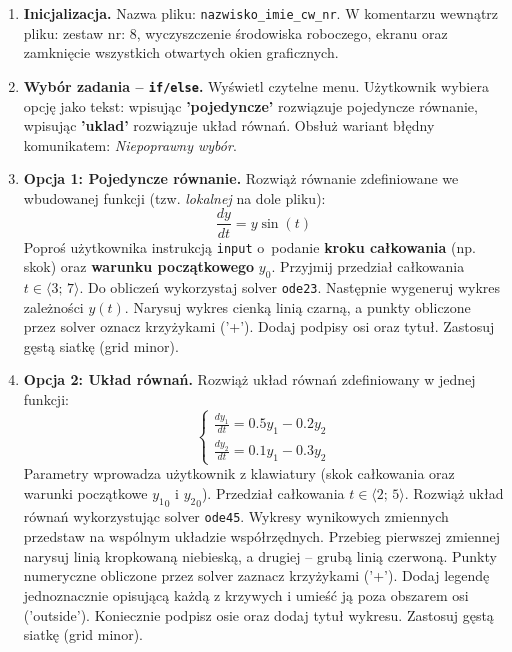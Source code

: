 \documentclass[a4paper,11pt]{article}
\begin{document}
\begin{enumerate}[leftmargin=*, label=\textbf{\arabic*.}, itemsep=2pt]

  \item \textbf{Inicjalizacja.}
    Nazwa pliku: \texttt{nazwisko\_imie\_cw\_nr}. W komentarzu wewnątrz pliku: zestaw nr: 8, wyczyszczenie środowiska roboczego, ekranu oraz zamknięcie wszystkich otwartych okien graficznych.

  \item \textbf{Wybór zadania -- \texttt{if/else}.}
    Wyświetl czytelne menu. Użytkownik wybiera opcję jako tekst: wpisując \textbf{'pojedyncze'} rozwiązuje pojedyncze równanie, wpisując \textbf{'uklad'} rozwiązuje układ równań. Obsłuż wariant błędny komunikatem: \textit{Niepoprawny wybór}.

  \item \textbf{Opcja 1: Pojedyncze równanie.}
    Rozwiąż równanie zdefiniowane we wbudowanej funkcji (tzw. \textit{lokalnej} na dole pliku):
    \[ \frac{dy}{dt} = y\sin(t) \]
    Poproś użytkownika instrukcją \texttt{input} o~podanie \textbf{kroku całkowania} (np. skok) oraz \textbf{warunku początkowego} $y_0$. Przyjmij przedział całkowania $t \in \langle 3;\,7 \rangle$.
    Do obliczeń wykorzystaj solver \texttt{ode23}. Następnie wygeneruj wykres zależności $y(t)$. Narysuj wykres cienką linią czarną, a punkty obliczone przez solver oznacz krzyżykami ('+'). Dodaj podpisy osi oraz tytuł. Zastosuj gęstą siatkę (grid minor).

  \item \textbf{Opcja 2: Układ równań.}
    Rozwiąż układ równań zdefiniowany w jednej funkcji:\\[-0.5em]
    \[
    \begin{cases}
      \frac{dy_1}{dt} = 0.5y_1 - 0.2y_2 \\
      \frac{dy_2}{dt} = 0.1y_1 - 0.3y_2
    \end{cases}
    \]
    Parametry wprowadza użytkownik z klawiatury (skok całkowania oraz warunki początkowe $ {y_1}_{0} $ i $ {y_2}_{0} $). Przedział całkowania $t \in \langle 2;\,5 \rangle$.
    Rozwiąż układ równań wykorzystując solver \texttt{ode45}. Wykresy wynikowych zmiennych przedstaw na wspólnym układzie współrzędnych. Przebieg pierwszej zmiennej narysuj linią kropkowaną niebieską, a drugiej -- grubą linią czerwoną. Punkty numeryczne obliczone przez solver zaznacz krzyżykami ('+'). Dodaj legendę jednoznacznie opisującą każdą z krzywych i umieść ją poza obszarem osi ('outside'). Koniecznie podpisz osie oraz dodaj tytuł wykresu. Zastosuj gęstą siatkę (grid minor).

\end{enumerate}
\end{document}
